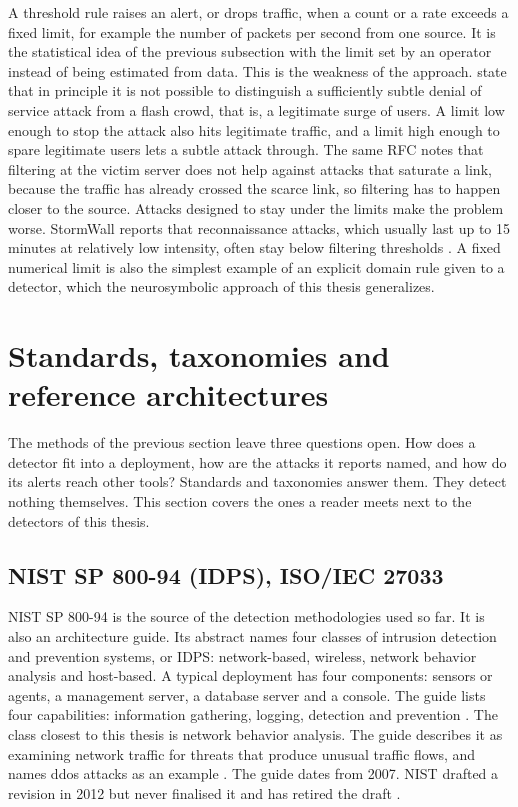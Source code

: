 A threshold rule raises an alert, or drops traffic, when a count or a rate
exceeds a fixed limit, for example the number of packets per second from one
source. It is the statistical idea of the previous subsection with the limit
set by an operator instead of being estimated from data. This is the
weakness of the approach. \citet{handley2006rfc4732} state that in principle
it is not possible to distinguish a sufficiently subtle denial of service
attack from a flash crowd, that is, a legitimate surge of users. A limit low
enough to stop the attack also hits legitimate traffic, and a limit high
enough to spare legitimate users lets a subtle attack through. The same RFC
notes that filtering at the victim server does not help against attacks that
saturate a link, because the traffic has already crossed the scarce link, so
filtering has to happen closer to the source. Attacks designed to stay under
the limits make the problem worse. StormWall reports that reconnaissance
attacks, which usually last up to 15 minutes at relatively low intensity,
often stay below filtering thresholds \citep{stormwall2026forecast}. A
fixed numerical limit is also the simplest example of an explicit domain
rule given to a detector, which the neurosymbolic approach of this thesis
generalizes.

\section{Standards, taxonomies and reference architectures}
\label{sec:standards-taxonomies}

The methods of the previous section leave three questions open. How does a
detector fit into a deployment, how are the attacks it reports named, and
how do its alerts reach other tools? Standards and taxonomies answer them.
They detect nothing themselves. This section covers the ones a reader meets
next to the detectors of this thesis.

\subsection{NIST SP 800-94 (IDPS), ISO/IEC 27033}
\label{sec:nist-iso-architectures}

NIST SP 800-94 is the source of the detection methodologies used so far. It
is also an architecture guide. Its abstract names four classes of intrusion
detection and prevention systems, or IDPS: network-based, wireless, network
behavior analysis and host-based. A typical deployment has four components:
sensors or agents, a management server, a database server and a console.
The guide lists four capabilities: information gathering, logging, detection
and prevention \citep{scarfone2007nist80094}. The class closest to this
thesis is network behavior analysis. The guide describes it as examining
network traffic for threats that produce unusual traffic flows, and names
\gls{ddos} attacks as an example \citep{scarfone2007nist80094}. The guide
dates from 2007. NIST drafted a revision in 2012 but never finalised it and
has retired the draft \citep{scarfone2007nist80094}.

